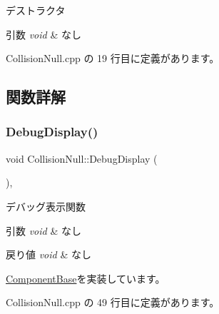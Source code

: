 デストラクタ 


\begin{DoxyParams}{引数}
{\em void} & なし \\
\hline
\end{DoxyParams}


 Collision\+Null.\+cpp の 19 行目に定義があります。



\subsection{関数詳解}
\mbox{\label{class_collision_null_a098fcf2c8ecc3c31706b720fbe852aca}} 
\subsubsection{\texorpdfstring{Debug\+Display()}{DebugDisplay()}}
{\footnotesize\ttfamily void Collision\+Null\+::\+Debug\+Display (\begin{DoxyParamCaption}{ }\end{DoxyParamCaption})\hspace{0.3cm}{\ttfamily [override]}, {\ttfamily [virtual]}}



デバッグ表示関数 


\begin{DoxyParams}{引数}
{\em void} & なし \\
\hline
\end{DoxyParams}

\begin{DoxyRetVals}{戻り値}
{\em void} & なし \\
\hline
\end{DoxyRetVals}


\mbox{\hyperlink{class_component_base_a36ae7d27ad9d756fa245bad443020407}{Component\+Base}}を実装しています。



 Collision\+Null.\+cpp の 49 行目に定義があります。

\mbox{\label{class_collision_null_a2bb1c8ca023aada97055256e033d823e}} 
